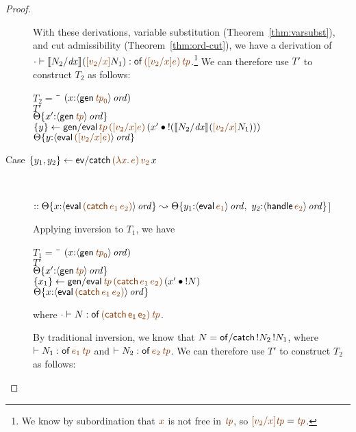 \begin{proof}
\begin{description}
With these derivations, 
variable substitution (Theorem~\ref{thm:varsubst}), and cut
admissibility (Theorem~\ref{thm:ord-cut}), we have a derivation of
$\cdot \vdash \rsubst{N_2}{\it dx}{(\lf{[v_2/x]}N_1)} : {\sf
  of}\,\lf{([v_2/x]e)}\,\lf{\it tp}$.\footnote{We know by
  subordination that $\lf{x}$ is not free in $\lf{\it tp}$, so
  $\lf{[v_2/x]{\it tp}} = \lf{\it tp}$.}  We can therefore use $T'$ to
construct $T_2$ as follows:
\begin{tabbing}
$T_2 = ~$ \= \qquad \= $(x{:}\istrue{\susp{{\sf gen}\,\lf{{\it tp}_0}}})$
\\
\>$T'$
\\
\>\>$\tackon{\Theta}{x'{:}\istrue{\susp{{\sf gen}\,\lf{\it tp}}}}$
\\
\>$\trstep{y}
     {{\sf gen/eval}\,\lf{tp}\,\lf{([v_2/x]e)}\,(\tfuser{x'}{\tbangr{(\rsubst{N_2}{\it
  dx}{(\lf{[v_2/x]}N_1)})}})}$
\\
\>\>$\tackon{\Theta}{y{:}\istrue{\susp{{\sf eval}\,\lf{([v_2/x]e)}}}}$
\end{tabbing}

\item 
  [Case $\trstep{y_1,y_2}{{\sf ev/catch}\,\lf{(\lambda x.\,e)}\,\lf{v_2}\,x}$]~
 
\qquad $:: \tackon{\Theta}{x{:}\istrue{\susp{{\sf eval}\,\lf{({\sf catch}\,e_1\,e_2)}}}}
       \leadsto 
        \tackon{\Theta}{y_1{:}\istrue{\susp{{\sf eval}\,\lf{e_1}}}, ~
                   y_2{:}\istrue{\susp{{\sf handle}\,\lf{e_2}}}}$]~

\medskip
Applying inversion to $T_1$, we have

\begin{tabbing}
$T_1 = ~$ \= \qquad \= $(x{:}\istrue{\susp{{\sf gen}\,\lf{{\it tp}_0}}})$
\\
\>$T'$
\\
\>\>$\tackon{\Theta}{x'{:}\istrue{\susp{{\sf gen}\,\lf{{\it tp}}}}}$
\\
\>$\trstep{x_1}
     {{\sf gen/eval}\,\lf{\it tp}\,\lf{({\sf catch}\,e_1\,e_2)}\,(\tfuser{x'}{\tbangr{N}})}$
\\
\>\>$\tackon{\Theta}{x{:}\istrue{\susp{{\sf eval}\,\lf{({\sf catch}\,e_1\,e_2)}}}}$
\end{tabbing}
where $\cdot \vdash N : \sf of\,\lf{({\sf catch}\,e_1\,e_2)}\,\lf{\it tp}$. 

\medskip
By traditional inversion, we 
know that $N = {\sf of/catch}\,{!}{N_2}\,{!}{N_1}$, where
 $\vdash N_1 : {\sf of}\,\lf{e_1}\,\lf{\it tp}$ and $\vdash N_2 :
{\sf of}\,\lf{e_2}\,\lf{\it tp}$.
We can therefore use $T'$ to construct $T_2$ as follows:


\end{description}
\end{proof}
